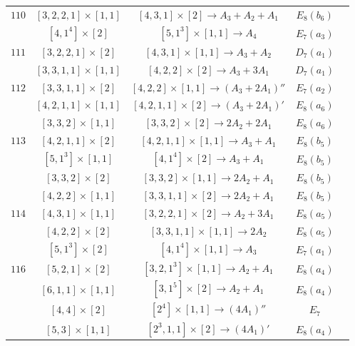 \documentclass[reqno,12pt]{amsart}
\numberwithin{equation}{section}
\theoremstyle{plain}
\theoremstyle{definition}
\begin{document}
\begin{table}[htbp]
\begin{tabular}{|c|c|c|c|c|}
$ 110$ 
&  $ [3,2,2,1]\times [1,1]$  &$[4,3,1]\times [2]\rightarrow  A_3+A_2+A_1$  &   $E_8(b_6) $       \\
&  $ [4,1^4]\times [2]$  &$[5,1^3]\times [1,1]\rightarrow  A_4$  &   $E_7(a_3)$       \\
\hline

$ 111$ 
&  $ [3,2,2,1]\times [2]$  &$[4,3,1]\times [1,1]\rightarrow  A_3+A_2$  &   $D_7(a_1) $       \\
&  $ [3,3,1,1]\times [1,1]$  &$[4,2,2]\times [2]\rightarrow  A_3+3A_1$  &   $D_7(a_1)$       \\
\hline

$ 112$ 
&  $ [3,3,1,1]\times [2]$  &$[4,2,2]\times [1,1]\rightarrow  (A_3+2A_1)''$  &   $E_7(a_2)$\\

&  $ [4,2,1,1]\times [1,1]$  &$[4,2,1,1]\times [2]\rightarrow  (A_3+2A_1)'$  &   $E_8(a_6)$\\

&  $ [3,3,2]\times [1,1]$  &$[3,3,2]\times [2]\rightarrow  2A_2+2A_1$  &    $E_8(a_6)$       \\
\hline


$ 113$ 
&  $ [4,2,1,1]\times [2]$  &$[4,2,1,1]\times [1,1]\rightarrow  A_3+A_1$  &   $E_8(b_5)$\\
&  $ [5,1^3]\times [1,1]$  &$[4,1^4]\times [2]\rightarrow  A_3+A_1$  &   $E_8(b_5)$\\
&  $ [3,3,2]\times [2]$  &$[3,3,2]\times [1,1]\rightarrow  2A_2+A_1$  &    $E_8(b_5)$       \\
&  $ [4,2,2]\times [1,1]$  &$[3,3,1,1]\times [2]\rightarrow  2A_2+A_1$  &   $E_8(b_5)$\\
\hline
$ 114$ 
&  $ [4,3,1]\times [1,1]$  &$[3,2,2,1]\times [2]\rightarrow  A_2+3A_1$  &    $E_8(a_5)$       \\

&  $ [4,2,2]\times [2]$  &$[3,3,1,1]\times [1,1]\rightarrow  2A_2$  &   $E_8(a_5)$\\
&  $ [5,1^3]\times [2]$  &$[4,1^4]\times [1,1]\rightarrow  A_3$  &   $E_7(a_1)$\\
\hline
$ 116$ 
&  $ [5,2,1]\times [2]$  &$[3,2,1^3]\times [1,1]\rightarrow  A_2+A_1$  &    $E_8(a_4)$       \\
&  $ [6,1,1]\times [1,1]$  &$[3,1^5]\times [2]\rightarrow  A_2+A_1$  &   $E_8(a_4)$\\
&  $ [4,4]\times [2]$  &$[2^4]\times [1,1]\rightarrow  (4A_1)''$  &   $E_7$\\


&  $ [5,3]\times [1,1]$  &$[2^3,1,1]\times [2]\rightarrow  (4A_1)'$  &   $E_8(a_4)$\\
\hline


\end{tabular}
	\bigskip
	
\end{table}
\end{document}
